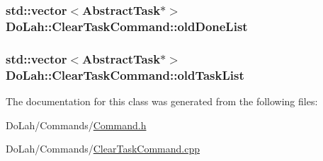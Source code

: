 \subsubsection[{old\+Done\+List}]{\setlength{\rightskip}{0pt plus 5cm}std\+::vector$<${\bf Abstract\+Task}$\ast$$>$ Do\+Lah\+::\+Clear\+Task\+Command\+::old\+Done\+List\hspace{0.3cm}{\ttfamily [private]}}\label{class_do_lah_1_1_clear_task_command_ad592ae71ee4f5a3fac3f15698401bb71}
\hypertarget{class_do_lah_1_1_clear_task_command_a5d4557b9d8c42cfede8ff6b11bf89862}{}
\subsubsection[{old\+Task\+List}]{\setlength{\rightskip}{0pt plus 5cm}std\+::vector$<${\bf Abstract\+Task}$\ast$$>$ Do\+Lah\+::\+Clear\+Task\+Command\+::old\+Task\+List\hspace{0.3cm}{\ttfamily [private]}}\label{class_do_lah_1_1_clear_task_command_a5d4557b9d8c42cfede8ff6b11bf89862}


The documentation for this class was generated from the following files\+:\begin{DoxyCompactItemize}
\item 
Do\+Lah/\+Commands/\hyperlink{_command_8h}{Command.\+h}\item 
Do\+Lah/\+Commands/\hyperlink{_clear_task_command_8cpp}{Clear\+Task\+Command.\+cpp}\end{DoxyCompactItemize}
